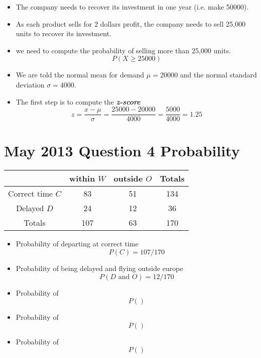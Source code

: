 \documentclass[12pts]{article}
\begin{document}
\begin{itemize}
\item The company needs to recover its investment in one year (i.e. make 50000).
\item As each product sells for 2 dollars profit, the company needs to sell 25,000 units to recover its investment.
\item we need to compute the probability of selling more than 25,000 units.
\[P(X \geq 25000) \]
\item We are told the normal mean for demand $\mu =20000$ and the normal standard deviation $\sigma = 4000$.
\item The first step is to compute the \textbf{\textit{z-score}}
\[ z = \frac{x - \mu}{\sigma}  = \frac{25000 - 20000}{4000} = \frac{5000}{4000} = 1.25\]
\end{itemize}

\newpage
\section*{May 2013 Question 4 Probability}
\begin{center}
\begin{tabular}{|c|c|c|c|}
\hline  & within $W$ & outside $O$ & Totals \\ 
\hline Correct time $C$ & 83 & 51 & 134 \\ 
\hline Delayed $D$ & 24 & 12 & 36 \\ 
\hline Totals & 107 & 63 & 170 \\ 
\hline 
\end{tabular} 
\end{center}\begin{itemize}
\item Probability of departing at correct time
\[P(C) = 107/170\]



\item Probability of being delayed and flying outside europe 
\[P(D  \mbox{ and } O) = 12/170\]
\item Probability of 
\[P() \]
\item Probability of 
\[P() \]
\item Probability of 
\[P() \]
\end{itemize}
\end{document}
